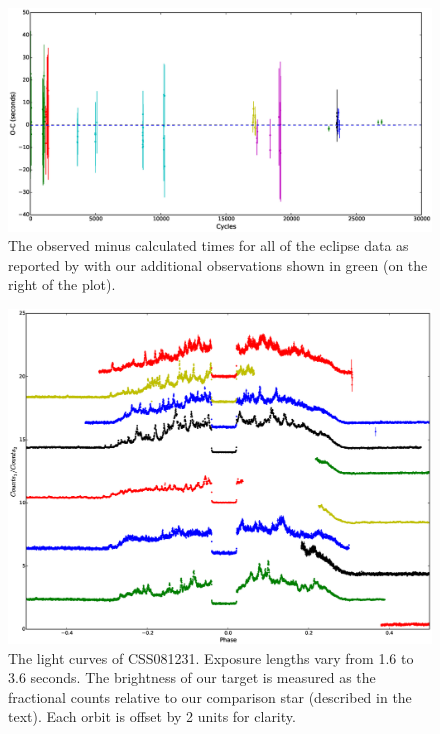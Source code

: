 \documentclass[a4paper,fleqn,usenatbib]{mnras}
\begin{document}
\begin{figure}
	\includegraphics[width=\columnwidth]{images/css081231_oc.eps}
    \caption{The observed minus calculated times for all of the eclipse data as reported by \citet{Schwope2015} with our additional observations shown in green (on the right of the plot). }
    \label{fig:ocdiagram}
\end{figure}

\begin{figure}
\centering
\includegraphics[width=\textwidth]{images/CSS081231_TNT_photometry.eps}
\caption[Caption for photometry]{The light curves of CSS081231. Exposure lengths vary from 1.6 to 3.6 seconds. The brightness of our target is measured as the fractional counts relative to our comparison star (described in the text). Each orbit is offset by 2 units for clarity.}
\label{fig:lightcurves}
\end{figure}
\end{document}
